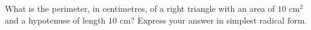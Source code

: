 What is the perimeter, in centimetres, of a right triangle with an area of $10\text{ cm}^2$ and a hypotenuse of length $10$ cm? Express your answer in simplest radical form.

